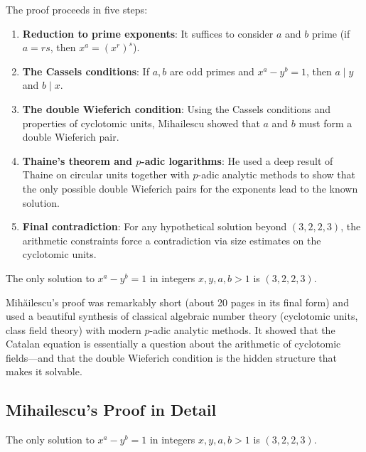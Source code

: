The proof proceeds in five steps:

\begin{enumerate}
\item \textbf{Reduction to prime exponents}: It suffices to consider $a$ and $b$ prime (if $a = rs$, then $x^a = (x^r)^s$).
\item \textbf{The Cassels conditions}: If $a, b$ are odd primes and $x^a - y^b = 1$, then $a \mid y$ and $b \mid x$.
\item \textbf{The double Wieferich condition}: Using the Cassels conditions and properties of cyclotomic units, Mihailescu showed that $a$ and $b$ must form a double Wieferich pair.
\item \textbf{Thaine's theorem and $p$-adic logarithms}: He used a deep result of Thaine on circular units together with $p$-adic analytic methods to show that the only possible double Wieferich pairs for the exponents lead to the known solution.
\item \textbf{Final contradiction}: For any hypothetical solution beyond $(3, 2, 2, 3)$, the arithmetic constraints force a contradiction via size estimates on the cyclotomic units.
\end{enumerate}

\begin{theorem}
The only solution to $x^a - y^b = 1$ in integers $x, y, a, b > 1$ is $(3, 2, 2, 3)$.
\end{theorem}

\begin{highlightbox}
Mihăilescu's proof was remarkably short (about 20 pages in its final form) and used a beautiful synthesis of classical algebraic number theory (cyclotomic units, class field theory) with modern $p$-adic analytic methods. It showed that the Catalan equation is essentially a question about the arithmetic of cyclotomic fields---and that the double Wieferich condition is the hidden structure that makes it solvable.
\end{highlightbox}

\subsection{Mihailescu's Proof in Detail}

\begin{theorem}
The only solution to $x^a - y^b = 1$ in integers $x, y, a, b > 1$ is $(3, 2, 2, 3)$.
\end{theorem}

